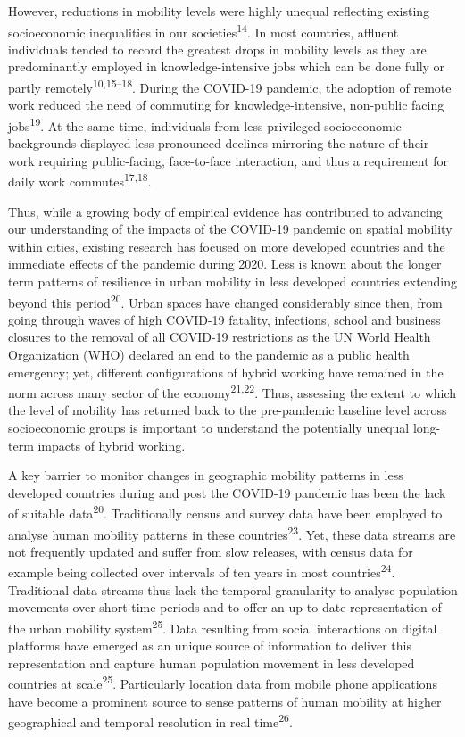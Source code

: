 \documentclass[
  11pt,
]{article}
\begin{document}
However, reductions in mobility levels were highly unequal reflecting
existing socioeconomic inequalities in our
societies\textsuperscript{14}. In most countries, affluent individuals
tended to record the greatest drops in mobility levels as they are
predominantly employed in knowledge-intensive jobs which can be done
fully or partly remotely\textsuperscript{10,15--18}. During the COVID-19
pandemic, the adoption of remote work reduced the need of commuting for
knowledge-intensive, non-public facing jobs\textsuperscript{19}. At the
same time, individuals from less privileged socioeconomic backgrounds
displayed less pronounced declines mirroring the nature of their work
requiring public-facing, face-to-face interaction, and thus a
requirement for daily work commutes\textsuperscript{17,18}.

Thus, while a growing body of empirical evidence has contributed to
advancing our understanding of the impacts of the COVID-19 pandemic on
spatial mobility within cities, existing research has focused on more
developed countries and the immediate effects of the pandemic during
2020. Less is known about the longer term patterns of resilience in
urban mobility in less developed countries extending beyond this
period\textsuperscript{20}. Urban spaces have changed considerably since
then, from going through waves of high COVID-19 fatality, infections,
school and business closures to the removal of all COVID-19 restrictions
as the UN World Health Organization (WHO) declared an end to the
pandemic as a public health emergency; yet, different configurations of
hybrid working have remained in the norm across many sector of the
economy\textsuperscript{21,22}. Thus, assessing the extent to which the
level of mobility has returned back to the pre-pandemic baseline level
across socioeconomic groups is important to understand the potentially
unequal long-term impacts of hybrid working.

A key barrier to monitor changes in geographic mobility patterns in less
developed countries during and post the COVID-19 pandemic has been the
lack of suitable data\textsuperscript{20}. Traditionally census and
survey data have been employed to analyse human mobility patterns in
these countries\textsuperscript{23}. Yet, these data streams are not
frequently updated and suffer from slow releases, with census data for
example being collected over intervals of ten years in most
countries\textsuperscript{24}. Traditional data streams thus lack the
temporal granularity to analyse population movements over short-time
periods and to offer an up-to-date representation of the urban mobility
system\textsuperscript{25}. Data resulting from social interactions on
digital platforms have emerged as an unique source of information to
deliver this representation and capture human population movement in
less developed countries at scale\textsuperscript{25}. Particularly
location data from mobile phone applications have become a prominent
source to sense patterns of human mobility at higher geographical and
temporal resolution in real time\textsuperscript{26}.
\end{document}
